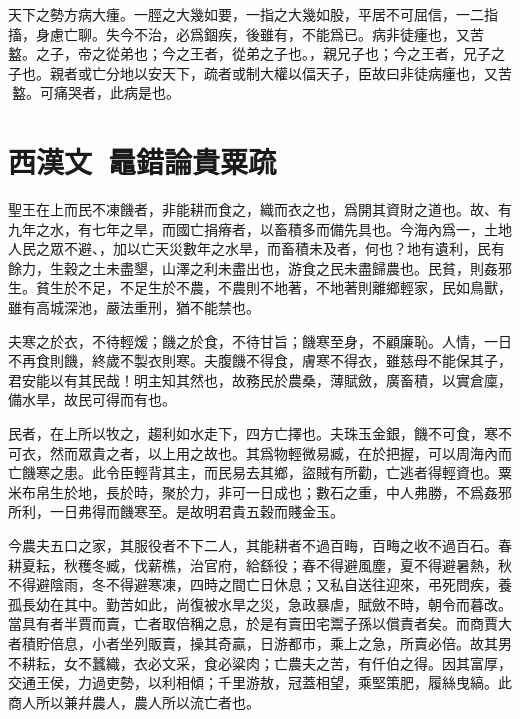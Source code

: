 天下之勢方病大瘇。一脛之大幾如要，一指之大幾如股，平居不可屈信，一二指搐，身慮亡聊。失今不治，必爲錮疾，後雖有，不能爲已。病非徒瘇也，又苦{\selectfont 𨂂}盭。之子，帝之從弟也；今之王者，從弟之子也。，親兄子也；今之王者，兄子之子也。親者或亡分地以安天下，疏者或制大權以偪天子，臣故曰非徒病瘇也，又苦{\selectfont 𨂂}盭。可痛哭者，此病是也。 

\theendnotes

\section[鼂錯論貴粟疏\quad{\small 西漢文}]{{\normalsize 西漢文\ 鼂錯}\quad 論貴粟疏}
聖王在上而民不凍饑者，非能耕而食之，織而衣之也，爲開其資財之道也。故、有九年之水，有七年之旱，而國亡捐瘠者，以畜積多而備先具也。今海內爲一，土地人民之眾不避、，加以亡天災數年之水旱，而畜積未及者，何也？地有遺利，民有餘力，生穀之土未盡墾，山澤之利未盡出也，游食之民未盡歸農也。民貧，則姦邪生。貧生於不足，不足生於不農，不農則不地著，不地著則離鄉輕家，民如鳥獸，雖有高城深池，嚴法重刑，猶不能禁也。

夫寒之於衣，不待輕煖；饑之於食，不待甘旨；饑寒至身，不顧廉恥。人情，一日不再食則饑，終歲不製衣則寒。夫腹饑不得食，膚寒不得衣，雖慈母不能保其子，君安能以有其民哉！明主知其然也，故務民於農桑，薄賦斂，廣畜積，以實倉廩，備水旱，故民可得而有也。

民者，在上所以牧之，趨利如水走下，四方亡擇也。夫珠玉金銀，饑不可食，寒不可衣，然而眾貴之者，以上用之故也。其爲物輕微易臧，在於把握，可以周海內而亡饑寒之患。此令臣輕背其主，而民易去其鄉，盜賊有所勸，亡逃者得輕資也。粟米布帛生於地，長於時，聚於力，非可一日成也；數石之重，中人弗勝，不爲姦邪所利，一日弗得而饑寒至。是故明君貴五穀而賤金玉。

今農夫五口之家，其服役者不下二人，其能耕者不過百畮，百畮之收不過百石。春耕夏耘，秋穫冬臧，伐薪樵，治官府，給繇役；春不得避風塵，夏不得避暑熱，秋不得避陰雨，冬不得避寒凍，四時之間亡日休息；又私自送往迎來，弔死問疾，養孤長幼在其中。勤苦如此，尚復被水旱之災，急政暴虐，賦斂不時，朝令而暮改。當具有者半賈而賣，亡者取倍稱之息，於是有賣田宅鬻子孫以償責者矣。而商賈大者積貯倍息，小者坐列販賣，操其奇贏，日游都市，乘上之急，所賣必倍。故其男不耕耘，女不蠶織，衣必文采，食必粱肉；亡農夫之苦，有仟伯之得。因其富厚，交通王侯，力過吏勢，以利相傾；千里游敖，冠蓋相望，乘堅策肥，履絲曳縞。此商人所以兼幷農人，農人所以流亡者也。

